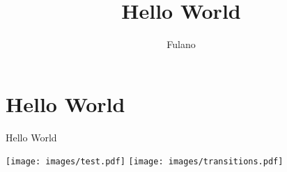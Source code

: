 \documentclass[A4paper, 12pt]{article}
\title{Hello World}
\author{Fulano}
\begin{document}
\nocite{*}
\tableofcontents
\maketitle

\cite{asyatoms}

\section{Hello World} %
\label{sec:hello_world}







Hello World


\texttt{[image: images/test.pdf]}
\newpage
\texttt{[image: images/transitions.pdf]}

{}

\end{document}
